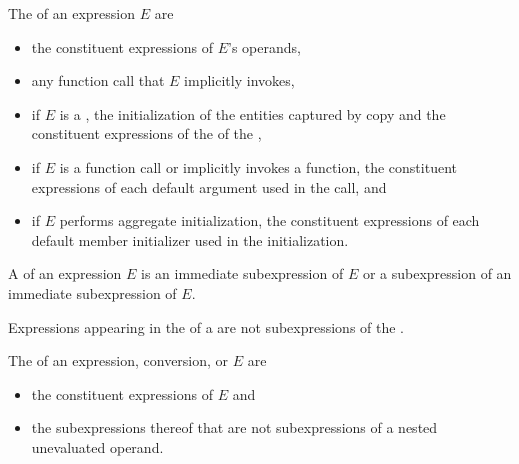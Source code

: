 \pnum
The  of an expression $E$ are
\begin{itemize}
\item
the constituent expressions of $E$'s operands,
\item
any function call that $E$ implicitly invokes,
\item
if $E$ is a ,
the initialization of the entities captured by copy and
the constituent expressions of the  of the ,
\item
if $E$ is a function call or implicitly invokes a function,
the constituent expressions of each default argument
used in the call, and
\item
if $E$ performs aggregate initialization,
the constituent expressions of each default member initializer
used in the initialization.
\end{itemize}

\pnum
A  of an expression $E$ is
an immediate subexpression of $E$ or
a subexpression of an immediate subexpression of $E$.
\begin{note}
Expressions appearing in the  of a 
are not subexpressions of the .
\end{note}
The  of
an expression, conversion, or  $E$ are
\begin{itemize}
\item
the constituent expressions of $E$ and
\item
the subexpressions thereof that
are not subexpressions of a nested unevaluated operand.
\end{itemize}

